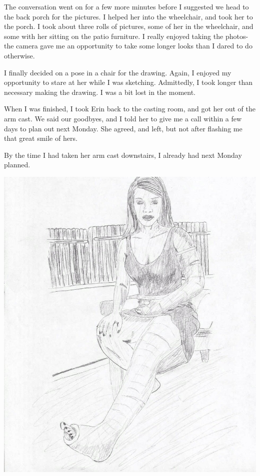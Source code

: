 The conversation went on for a few more minutes before I suggested we head to the back porch
for the pictures. I helped her into the wheelchair, and took her to the porch. I took about
three rolls of pictures, some of her in the wheelchair, and some with her sitting on the patio
furniture. I really enjoyed taking the photos- the camera gave me an opportunity to take some
longer looks than I dared to do otherwise.

I finally decided on a pose in a chair for the drawing. Again, I enjoyed my opportunity to
stare at her while I was sketching. Admittedly, I took longer than necessary making the drawing.
I was a bit lost in the moment.

When I was finished, I took Erin back to the casting room, and got her out of the arm cast.
We said our goodbyes, and I told her to give me a call within a few days to plan out next
Monday. She agreed, and left, but not after flashing me that great smile of hers.

By the time I had taken her arm cast downstairs, I already had next Monday planned.

\begin{center}
\includegraphics{images/kicks21.jpg}
\end{center}
